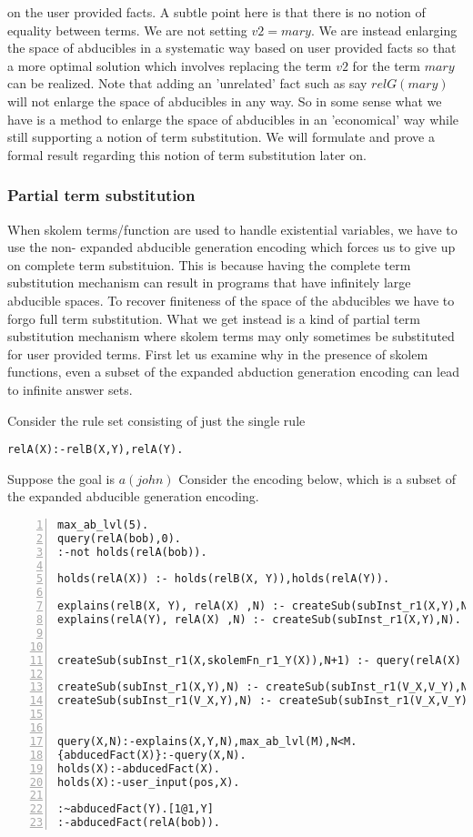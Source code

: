 \documentclass[sigconf]{acmart}
\begin{document}
on the user provided facts. A subtle point here is that there is no notion of
equality between terms. We are not setting $v2 = mary$. We are instead
enlarging the space of abducibles in a systematic way based on user provided
facts so that a more optimal solution which involves replacing the term $v2$
for the term $mary$ can be realized. Note that adding an 'unrelated' fact such
as say $relG(mary)$ will not enlarge the space of abducibles in any way. So in
some sense what we have is a method to enlarge the space of abducibles in an
'economical' way while still supporting a notion of term substitution. We will
formulate and prove a formal result regarding this notion of term substitution
later on.

\subsubsection{Partial term substitution}

When skolem terms/function are used to handle existential variables, we have
to use the non- expanded abducible generation encoding which forces us to give
up on complete term substituion.  This is because having the complete term
substitution mechanism can result in programs that have infinitely large
abducible spaces. To recover finiteness of the space of the abducibles we have
to forgo full term substitution. What we get instead is a kind of partial term
substitution mechanism where skolem terms may only sometimes be substituted
for user provided terms.  First let us examine why in the presence of skolem
functions, even a subset of the expanded abduction generation encoding can
lead to infinite answer sets.

Consider the rule set consisting of just the single rule 
\begin{verbatim}
relA(X):-relB(X,Y),relA(Y).
\end{verbatim}

Suppose the goal is $a(john)$
Consider the encoding below, which is a subset of the expanded abducible generation encoding.
\begin{lstlisting}[numbers=left]
max_ab_lvl(5).
query(relA(bob),0).
:-not holds(relA(bob)).

holds(relA(X)) :- holds(relB(X, Y)),holds(relA(Y)).

explains(relB(X, Y), relA(X) ,N) :- createSub(subInst_r1(X,Y),N).
explains(relA(Y), relA(X) ,N) :- createSub(subInst_r1(X,Y),N).


createSub(subInst_r1(X,skolemFn_r1_Y(X)),N+1) :- query(relA(X) ,N),max_ab_lvl(M),N<M-1.

createSub(subInst_r1(X,Y),N) :- createSub(subInst_r1(V_X,V_Y),N), holds(relB(X, Y)).
createSub(subInst_r1(V_X,Y),N) :- createSub(subInst_r1(V_X,V_Y),N),holds(relA(Y)).


query(X,N):-explains(X,Y,N),max_ab_lvl(M),N<M.
{abducedFact(X)}:-query(X,N).
holds(X):-abducedFact(X).
holds(X):-user_input(pos,X).

:~abducedFact(Y).[1@1,Y]
:-abducedFact(relA(bob)).
\end{lstlisting}
\end{document}
